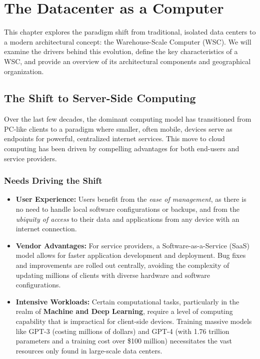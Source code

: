 \chapter{The Datacenter as a Computer}

This chapter explores the paradigm shift from traditional, isolated data centers to a modern architectural concept: the Warehouse-Scale Computer (WSC). We will examine the drivers behind this evolution, define the key characteristics of a WSC, and provide an overview of its architectural components and geographical organization.

\section{The Shift to Server-Side Computing}
Over the last few decades, the dominant computing model has transitioned from PC-like clients to a paradigm where smaller, often mobile, devices serve as endpoints for powerful, centralized internet services. This move to cloud computing has been driven by compelling advantages for both end-users and service providers.

\subsection{Needs Driving the Shift}
\begin{itemize}
    \item \textbf{User Experience:} Users benefit from the \textit{ease of management}, as there is no need to handle local software configurations or backups, and from the \textit{ubiquity of access} to their data and applications from any device with an internet connection.
    \item \textbf{Vendor Advantages:} For service providers, a Software-as-a-Service (SaaS) model allows for faster application development and deployment. Bug fixes and improvements are rolled out centrally, avoiding the complexity of updating millions of clients with diverse hardware and software configurations.
    \item \textbf{Intensive Workloads:} Certain computational tasks, particularly in the realm of \textbf{Machine and Deep Learning}, require a level of computing capability that is impractical for client-side devices. Training massive models like GPT-3 (costing millions of dollars) and GPT-4 (with 1.76 trillion parameters and a training cost over \$100 million) necessitates the vast resources only found in large-scale data centers.
\end{itemize}

